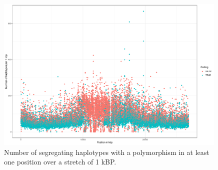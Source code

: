 \begin{figure}[th]
\centering
\includegraphics[height=.55\textheight, width=0.99\textwidth]{Figures/chr5_hap}
\decoRule
\caption[Haplotype strutcture of chromosome 5 of \textit{A. thaliana}]{Number of segregating haplotypes with a polymorphism in at least one position over a stretch of 1 kBP. }
\label{fig:chr5}
\end{figure}



